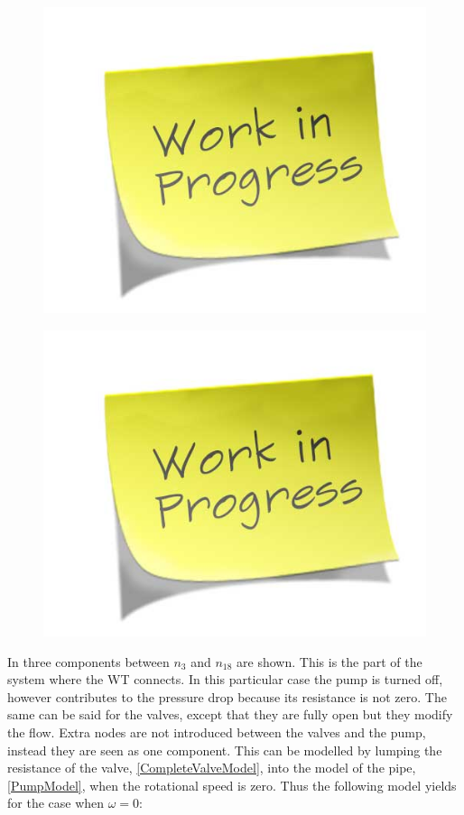 \begin{figure}[H]
\centering
\begin{minipage}{0.5\textwidth}
  \centering
  \includegraphics[width=0.65\linewidth]{report/pictures/missingfigure}
  \label{fig:subsys_1}
\end{minipage}%
\begin{minipage}{0.5\textwidth}
  \centering
  \includegraphics[width=0.65\linewidth]{report/pictures/missingfigure}
  \label{fig:subsys_2}
\end{minipage}
\end{figure}

In  three components between $n_3$ and $n_{18}$ are shown. This is the part of the system where the WT connects. In this particular case the pump is turned off, however contributes to the pressure drop because its resistance is not zero. The same can be said for the valves, except that they are fully open but they modify the flow. Extra nodes are not introduced between the valves and the pump, instead they are seen as one component. This can be modelled by lumping the resistance of the valve, \eqref{CompleteValveModel}, into the model of the pipe, \eqref{PumpModel}, when the rotational speed is zero. Thus the following model yields for the case when $\omega = 0$:


